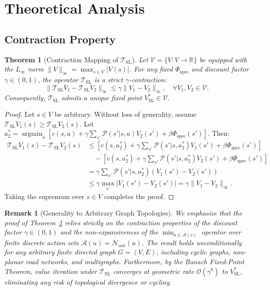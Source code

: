 \documentclass[11pt,a4paper]{article}
\newtheorem{theorem}{Theorem}
\newtheorem{remark}{Remark}
\begin{document}
\section{Theoretical Analysis}
\label{sec:theory}

\subsection{Contraction Property}
\begin{theorem}[Contraction Mapping of $\mathcal{T}_{\text{SL}}$]
\label{thm:contraction}
Let $\mathcal{V} = \{V: V \to \mathbb{R}\}$ be equipped with the $L_\infty$ norm $\|V\|_\infty = \max_{s \in V} |V(s)|$. For any fixed $\Phi_{\text{spec}}$ and discount factor $\gamma \in (0, 1)$, the operator $\mathcal{T}_{\text{SL}}$ is a strict $\gamma$-contraction:
\begin{equation}
\|\mathcal{T}_{\text{SL}} V_1 - \mathcal{T}_{\text{SL}} V_2\|_\infty \le \gamma \|V_1 - V_2\|_\infty, \quad \forall V_1, V_2 \in \mathcal{V}.
\end{equation}
Consequently, $\mathcal{T}_{\text{SL}}$ admits a unique fixed point $V_{\text{SL}}^* \in \mathcal{V}$.
\end{theorem}

\begin{proof}
Let $s \in V$ be arbitrary. Without loss of generality, assume $\mathcal{T}_{\text{SL}} V_1(s) \ge \mathcal{T}_{\text{SL}} V_2(s)$. Let $a_2^* = \operatorname{argmin}_a [ c(s, a) + \gamma \sum_{s'} \mathcal{P}(s'|s,a) V_2(s') + \beta \Phi_{\text{spec}}(s') ]$. Then:
\begin{align*}
\mathcal{T}_{\text{SL}} V_1(s) - \mathcal{T}_{\text{SL}} V_2(s) &\le \left[ c(s, a_2^*) + \gamma \sum_{s'} \mathcal{P}(s'|s, a_2^*) V_1(s') + \beta \Phi_{\text{spec}}(s') \right] \\
&\quad - \left[ c(s, a_2^*) + \gamma \sum_{s'} \mathcal{P}(s'|s, a_2^*) V_2(s') + \beta \Phi_{\text{spec}}(s') \right] \\
&= \gamma \sum_{s'} \mathcal{P}(s'|s, a_2^*) (V_1(s') - V_2(s')) \\
&\le \gamma \max_{s'} |V_1(s') - V_2(s')| = \gamma \|V_1 - V_2\|_\infty.
\end{align*}
Taking the supremum over $s \in V$ completes the proof.
\end{proof}

\begin{remark}[Generality to Arbitrary Graph Topologies]
We emphasize that the proof of Theorem~\ref{thm:contraction} relies strictly on the contraction properties of the discount factor $\gamma \in (0, 1)$ and the non-expansiveness of the $\min_{a \in \mathcal{A}(s)}$ operator over finite discrete action sets $\mathcal{A}(u) = \mathcal{N}_{\text{out}}(u)$. The result holds unconditionally for \textit{any arbitrary finite directed graph} $G = (V, E)$, including cyclic graphs, non-planar road networks, and multigraphs. Furthermore, by the Banach Fixed-Point Theorem, value iteration under $\mathcal{T}_{\text{SL}}$ converges at geometric rate $\mathcal{O}(\gamma^k)$ to $V_{\text{SL}}^*$, eliminating any risk of topological divergence or cycling.
\end{remark}
\end{document}
